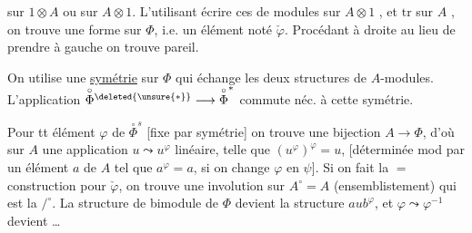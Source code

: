 
sur $1\otimes A$ ou sur $A\otimes1$. L'utilisant
 écrire ces  de modules sur
$A\otimes1$ , et  $\mathrm{tr}$ sur $A$
, on
trouve une forme sur $\Phi$, i.e. un élément noté
$\check\varphi$. Procédant à droite au lieu de prendre
à gauche on trouve pareil.

On  utilise une \uline{symétrie} sur $\Phi$ qui
échange les deux structures de $A$-modules.
L'application $\overset{\circ}{\Phi}{}^{\deleted{\unsure{*}}}\longrightarrow\overset{\circ}{\Phi}^{*}$
commute néc. à cette symétrie.

Pour tt élément $\varphi$ de $\overset{\circ}{\Phi}^s$ [fixe par
symétrie] on trouve une bijection
$A\longrightarrow\Phi$, d'où sur $A$ une 
application $u\leadsto u^\varphi$ linéaire, telle que
$(u^\varphi)^\varphi=u$, [déterminée mod 
par un élément $a$ de $A$ tel que $a^\varphi=a$, si
on change $\varphi$ en $\psi$].
Si on fait la $=$ construction pour $\check\varphi$, on trouve une
involution sur $A^\circ=A$ (ensemblistement)
qui est la $\mathord{/}^{\circ}$.
La structure de  bimodule de
$\Phi$ devient la structure $aub^\varphi$, et $\varphi\leadsto\varphi^{-1}$ devient
 \ldots
